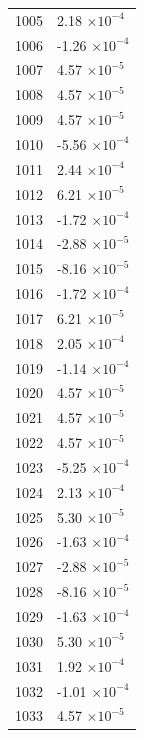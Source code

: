 \documentclass[a4paper,11pt]{article}
\begin{document}
\begin{center}
\begin{longtable}{|R{1.5cm}|R{2.5cm}|}
 1005 &         2.18 $\times 10^{          -4}$ \\
 1006 &        -1.26 $\times 10^{          -4}$ \\
 1007 &         4.57 $\times 10^{          -5}$ \\
 1008 &         4.57 $\times 10^{          -5}$ \\
 1009 &         4.57 $\times 10^{          -5}$ \\
 1010 &        -5.56 $\times 10^{          -4}$ \\
 1011 &         2.44 $\times 10^{          -4}$ \\
 1012 &         6.21 $\times 10^{          -5}$ \\
 1013 &        -1.72 $\times 10^{          -4}$ \\
 1014 &        -2.88 $\times 10^{          -5}$ \\
 1015 &        -8.16 $\times 10^{          -5}$ \\
 1016 &        -1.72 $\times 10^{          -4}$ \\
 1017 &         6.21 $\times 10^{          -5}$ \\
 1018 &         2.05 $\times 10^{          -4}$ \\
 1019 &        -1.14 $\times 10^{          -4}$ \\
 1020 &         4.57 $\times 10^{          -5}$ \\
 1021 &         4.57 $\times 10^{          -5}$ \\
 1022 &         4.57 $\times 10^{          -5}$ \\
 1023 &        -5.25 $\times 10^{          -4}$ \\
 1024 &         2.13 $\times 10^{          -4}$ \\
 1025 &         5.30 $\times 10^{          -5}$ \\
 1026 &        -1.63 $\times 10^{          -4}$ \\
 1027 &        -2.88 $\times 10^{          -5}$ \\
 1028 &        -8.16 $\times 10^{          -5}$ \\
 1029 &        -1.63 $\times 10^{          -4}$ \\
 1030 &         5.30 $\times 10^{          -5}$ \\
 1031 &         1.92 $\times 10^{          -4}$ \\
 1032 &        -1.01 $\times 10^{          -4}$ \\
 1033 &         4.57 $\times 10^{          -5}$ \\

\end{longtable}
\end{center}
\end{document}
